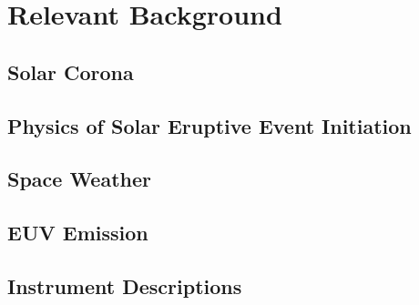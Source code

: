 \chapter{Relevant Background}
\label{chapterbackground}

\section{Solar Corona}

\section{Physics of Solar Eruptive Event Initiation}

\section{Space Weather}

\section{EUV Emission}

\section{Instrument Descriptions}
